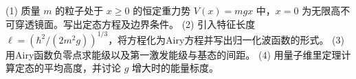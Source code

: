 (1) 质量 \(m\) 的粒子处于 \(x\ge0\) 的恒定重力势 \(V(x)=mgx\) 中，\(x=0\) 为无限高不可穿透镜面。写出定态方程及边界条件。
(2) 引入特征长度 \(\ell=(\hbar^2/(2m^2g))^{1/3}\)，将方程化为Airy方程并写出归一化波函数的形式。
(3) 用Airy函数负零点求能级以及第一激发能级与基态的间距。
(4) 用量子维里定理计算定态的平均高度，并讨论 \(g\) 增大时的能量标度。
